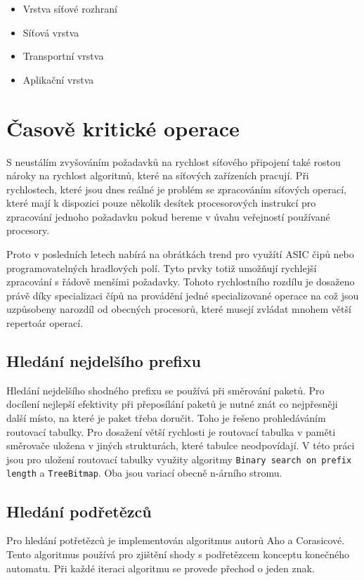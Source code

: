 \begin{itemize}
\item{Vrstva síťové rozhraní}
\item{Síťová vrstva}
\item{Transportní vrstva}
\item{Aplikační vrstva}
\end{itemize}

\section{Časově kritické operace}
S neustálím zvyšováním požadavků na rychlost síťového připojení také rostou nároky na rychlost
algoritmů, které na síťových zařízeních pracují. Při rychlostech, které jsou dnes reálné je problém se zpracováním
síťových operací, které mají k dispozici pouze několik desítek procesorových instrukcí pro zpracování jednoho požadavku
pokud bereme v úvahu veřejností používané procesory.

Proto v posledních letech nabírá na obrátkách trend pro využítí ASIC čipů nebo programovatelných hradlových polí.
Tyto prvky totiž umožňují rychlejší zpracování s řádově menšími požadavky.
Tohoto rychlostního rozdílu je dosaženo právě díky specializaci čípů na provádění jedné specializované operace na což jsou uzpůsobeny
narozdíl od obecných procesorů, které musejí zvládat mnohem větší repertoár operací.

\subsection{Hledání nejdelšího prefixu}
Hledání nejdelšího shodného prefixu se používá při směrování paketů.
Pro docílení nejlepší efektivity při přeposílání paketů je nutné znát co nejpřesněji další místo, na které je paket třeba doručit.
Toho je řešeno prohledáváním routovací tabulky.
Pro dosažení větší rychlosti je routovací tabulka v paměti směrovače uložena v jiných strukturách, které tabulce neodpovídají.
V této práci jsou pro uložení routovací tabulky využity algoritmy {\tt Binary search on prefix length} a {\tt TreeBitmap}.
Oba jsou variací obecně n-árního stromu.


\subsection{Hledání podřetězců}
Pro hledání potřetězců je implementován algoritmus autorů Aho a Corasicové. Tento algoritmus používá pro zjištění shody s podřetězcem konceptu konečného automatu. Při každé iteraci algoritmu se provede přechod o jeden znak.

